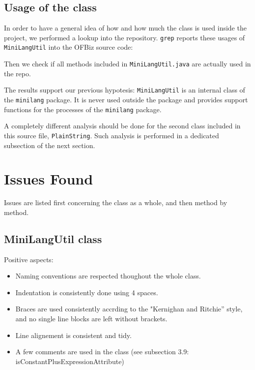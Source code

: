 \documentclass[11pt]{article} %
\begin{document}
\subsection{Usage of the class}

In order to have a general idea of how and how much the class is used inside the project, we performed a lookup into the repository. \texttt{grep} reports these usages of \texttt{MiniLangUtil} into the OFBiz source code:



Then we check if all methods included in \texttt{MiniLangUtil.java} are actually used in the repo.



The results support our previous hypotesis: \texttt{MiniLangUtil} is an internal class of the \texttt{minilang} package. It is never used outside the package and provides support functions for the processes of the \texttt{minilang} package.

A completely different analysis should be done for the second class included in this source file, \texttt{PlainString}. Such analysis is performed in a dedicated subsection of the next section.


\section{Issues Found}
Issues are listed first concerning the class as a whole, and then method by method.

\subsection{MiniLangUtil class}

Positive aspects:
\begin{itemize}[noitemsep]
	\item Naming conventions are respected thoughout the whole class.
	\item Indentation is consistently done using 4 spaces.
	\item Braces are used consistently accrding to the "Kernighan and Ritchie” style, and no single line blocks are left without brackets.
	\item Line alignement is consistent and tidy.
	\item A few comments are used in the class (see subsection 3.9: isConstantPlusExpressionAttribute)
\end{itemize}
\end{document}
